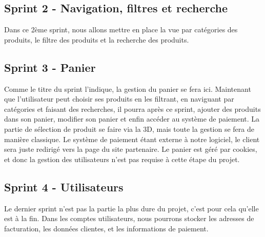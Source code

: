 \documentclass[12pt]{article}
\begin{document}
\subsection{Sprint 2 - Navigation, filtres et recherche}
Dans ce 2ème sprint, nous allons mettre en place la vue par catégories des produits, le filtre des produits et la recherche des produits.

\subsection{Sprint 3 - Panier}
Comme le titre du sprint l'indique, la gestion du panier se fera ici. Maintenant que l'utilisateur peut choisir ses produits en les filtrant, en naviguant
par catégories et faisant des recherches, il pourra après ce sprint, ajouter des produits dans son panier, modifier son panier et enfin accéder au système de paiement.
La partie de sélection de produit se faire via la 3D, mais toute la gestion se fera de manière classique.
Le système de paiement étant externe à notre logiciel, le client sera juste redirigé vers la page du site partenaire.
Le panier est géré par cookies, et donc la gestion des utilisateurs n'est pas requise à cette étape du projet.

\subsection{Sprint 4 - Utilisateurs}
Le dernier sprint n'est pas la partie la plus dure du projet, c'est pour cela qu'elle est à la fin.
Dans les comptes utilisateurs, nous pourrons stocker les adresses de facturation, les données clientes, et les informations de paiement.
\end{document}
